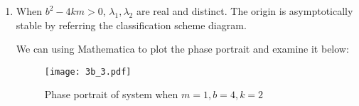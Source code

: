 \documentclass[12pt]{exam}
\begin{document}
\begin{enumerate}
\begin{enumerate}
		\item When $b^2-4km > 0$, $\lambda_1, \lambda_2$ are real and distinct. The origin is asymptotically stable by referring the classification scheme diagram.

			We can using Mathematica to plot the phase portrait and examine it below:
			\begin{figure}[H]
				\centering
				\texttt{[image: 3b\_3.pdf]}
				\caption{Phase portrait of system when $m=1, b=4, k=2$}
				\label{fig:3b_3}
			\end{figure}




	\end{enumerate}
\end{enumerate}
\end{document}
